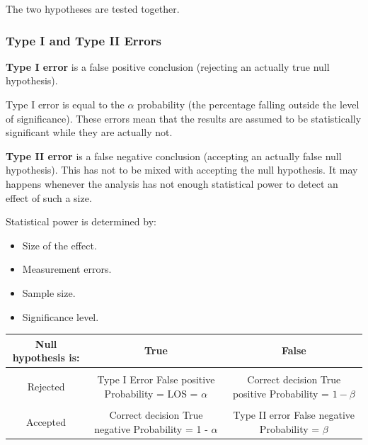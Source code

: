\documentclass{article}
\begin{document}
The two hypotheses are tested together. 

\subsubsection{Type I and Type II Errors}
\textbf{Type I error} is a false positive conclusion (rejecting an actually true null hypothesis). 

Type I error is equal to the $\alpha$ probability (the percentage falling outside the level of significance). 
These errors mean that the results are assumed to be statistically significant while they are actually not.

\textbf{Type II error} is a false negative conclusion (accepting an actually false null hypothesis). 
This has not to be mixed with accepting the null hypothesis. 
It may happens whenever the analysis has not enough statistical power to detect an effect of such a size. 

Statistical power is determined by:
\begin{itemize}
    \item Size of the effect.
    \item Measurement errors.
    \item Sample size.
    \item Significance level.
\end{itemize}
 
\begin{center}
\begin{tabular}{|c|c|c|}
\hline
Null hypothesis is: & True & False \\ \hline
&&\\[-1em]
Rejected & \makecell {Type I Error \\ False positive \\ Probability = LOS = $\alpha$} & \makecell {Correct decision \\ True positive \\ Probability = $1-\beta$} \\ \hline
&&\\[-1em]
Accepted & \makecell {Correct decision \\ True negative \\ Probability = 1 - $\alpha$ } & \makecell{Type II error \\ False negative \\ Probability = $\beta$} \\
\hline
\end{tabular}
\end{center}
\end{document}
